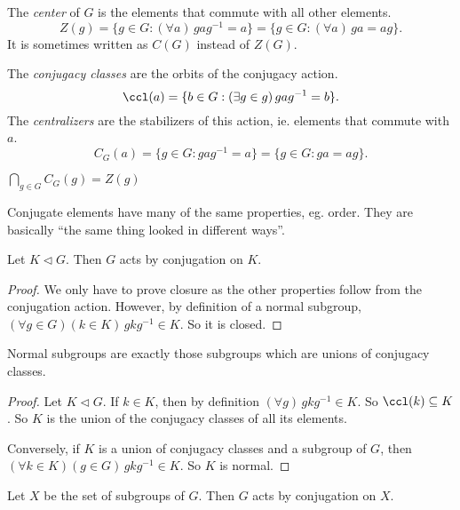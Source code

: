 \documentclass[a4paper]{article}
\begin{document}
\begin{defi}
  The \emph{center} of $G$ is the elements that commute with all other elements.
  \[
    Z(g) = \{g\in G: (\forall a)\,gag^{-1} = a\} = \{g\in G: (\forall a)\,ga = ag\}.
  \]
  It is sometimes written as $C(G)$ instead of $Z(G)$.
\end{defi}

\begin{defi}
  The \emph{conjugacy classes} are the orbits of the conjugacy action.
  \[
    \ccl(a) = \{b\in G: (\exists g\in g)\,gag^{-1} = b\}.
  \]
  The \emph{centralizers} are the stabilizers of this action, ie. elements that commute with $a$.
  \[
    C_G(a) = \{g\in G: gag^{-1} = a\} = \{g\in G: ga = ag\}.
  \]
\end{defi}

\note $\bigcap_{g\in G} C_G(g) = Z(g)$

\note Conjugate elements have many of the same properties, eg. order. They are basically ``the same thing looked in different ways''.

\begin{lemma}
  Let $K\lhd G$. Then $G$ acts by conjugation on $K$.
\end{lemma}

\begin{proof}
  We only have to prove closure as the other properties follow from the conjugation action. However, by definition of a normal subgroup, $(\forall g\in G)(k\in K)\,gkg^{-1}\in K$.  So it is closed.
\end{proof}

\begin{prop}
  Normal subgroups are exactly those subgroups which are unions of conjugacy classes.
\end{prop}

\begin{proof}
  Let $K\lhd G$. If $k\in K$, then by definition $(\forall g)\,gkg^{-1}\in K$. So $\ccl(k)\subseteq K$. So $K$ is the union of the conjugacy classes of all its elements.

  Conversely, if $K$ is a union of conjugacy classes and a subgroup of $G$, then $(\forall k\in K)(g\in G)\,gkg^{-1}\in K$. So $K$ is normal.
\end{proof}

\begin{lemma}
  Let $X$ be the set of subgroups of $G$. Then $G$ acts by conjugation on $X$.
\end{lemma}
\end{document}
